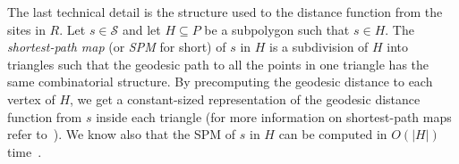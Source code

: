 \documentclass[a4paper,UKenglish]{socg-lipics-v2018}
\newcommand{\s}{\mathcal S}
\newcommand{\funnel}[2][P]{\ensuremath{\sigma_{\scriptscriptstyle #1}(#2)}}
\newcommand{\cell}[2][P]{\ensuremath{\mathsf{Cell}_{\scriptscriptstyle #1}(#2)}}
\newcommand{\bcell}[2][P]{\ensuremath{\partial_{\scriptscriptstyle #1}(#2)}}
\newcommand{\red}{\color{red}}
\newcommand{\marrow}{\marginpar[\hfill$\longrightarrow$]{$\longleftarrow$}}
\newcommand{\luis}[1]{{\red \textsc{Luis:} \marrow\textsf{#1}}}
\begin{document}
%
%

The last technical detail is the structure used to the distance function from the sites in $R$.
Let $s\in \s$ and let $H\subseteq P$ be a subpolygon such that $s\in H$.
The \emph{shortest-path map} (or \emph{SPM} for short) of $s$ in $H$ is a subdivision of $H$ into triangles such that the geodesic path to all the points in one triangle has the same combinatorial structure. 
By precomputing the geodesic distance to each vertex of $H$, we get a constant-sized representation of the geodesic distance function from $s$ inside each triangle (for more information on shortest-path maps refer to~\cite{guibasShortestPathTree}). We know also that the SPM of $s$ in $H$ can be computed in $O(|H|)$ time~\cite{chazelle1991triangulating,guibasShortestPathTree}. 
\end{document}
